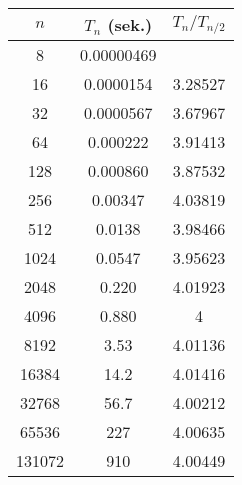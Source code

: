 \begin{figure}[t]
\begin{minipage}[t]{0.35\textwidth}
  \begin{tabular}{S[table-format=6.0]S[table-format= 3.8]S[table-format=1.2, round-mode=places,round-precision=2]}\toprule
    {$n$} & {$T_n$ (sek.)}  & {$T_n/T_{n/2}$} \\     &   0.00000469  &  \\ 
    16    &   0.0000154         & 3.28527 \\ 
    32      & 0.0000567         & 3.67967 \\ 
    64      & 0.000222          & 3.91413 \\ 
    128     & 0.000860          & 3.87532 \\ 
    256     & 0.00347           & 4.03819 \\ 
    512     & 0.0138            & 3.98466 \\ 
    1024    & 0.0547            & 3.95623 \\ 
    2048    & 0.220           & 4.01923 \\ 
    4096    & 0.880             & 4 \\ 
    8192    & 3.53              & 4.01136 \\ 
    16384   & 14.2              & 4.01416 \\ 
    32768   & 56.7              & 4.00212 \\ 
    65536   & 227               & 4.00635 \\ 
    131072  & 910               & 4.00449 \\ \bottomrule
\end{tabular}
\end{minipage}
%
  \begin{minipage}{0.65\textwidth}
\end{minipage}
\end{figure}
